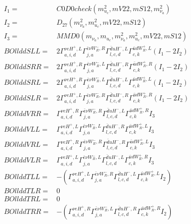 \documentclass[A4,landscape]{article}
\begin{document}
\begin{align} 
I_1 = & C0D0check(m^2_{u_{{c}}}, mV22, mS12, m^2_{\nu_{{a}}}) \\ 
I_2 = & D_{27}(m^2_{\nu_{{a}}}, m^2_{u_{{c}}}, mV22, mS12) \\ 
I_3 = & MMD0(m_{\nu_{{a}}}, m_{u_{{c}}}, m^2_{\nu_{{a}}}, m^2_{u_{{c}}}, mV22, mS12) \\ 
  BOllddSLL= & 2  \Gamma^{\nu e H^+,L}_{a, i, d} \Gamma^{\bar{e}\nu W_R^- ,R}_{j, a} \Gamma^{\bar{d}u H^- ,L}_{l, c, d} \Gamma^{\bar{u}d W_R^+,L}_{c, k} (I_1 - 2 I_2) \\ 
  BOllddSRR= & 2  \Gamma^{\nu e H^+,R}_{a, i, d} \Gamma^{\bar{e}\nu W_R^- ,L}_{j, a} \Gamma^{\bar{d}u H^- ,R}_{l, c, d} \Gamma^{\bar{u}d W_R^+,R}_{c, k} (I_1 - 2 I_2) \\ 
  BOllddSRL= & 2  \Gamma^{\nu e H^+,R}_{a, i, d} \Gamma^{\bar{e}\nu W_R^- ,L}_{j, a} \Gamma^{\bar{d}u H^- ,L}_{l, c, d} \Gamma^{\bar{u}d W_R^+,L}_{c, k} (I_1 - 2 I_2) \\ 
  BOllddSLR= & 2  \Gamma^{\nu e H^+,L}_{a, i, d} \Gamma^{\bar{e}\nu W_R^- ,R}_{j, a} \Gamma^{\bar{d}u H^- ,R}_{l, c, d} \Gamma^{\bar{u}d W_R^+,R}_{c, k} (I_1 - 2 I_2) \\ 
  BOllddVRR= &  \Gamma^{\nu e H^+,R}_{a, i, d} \Gamma^{\bar{e}\nu W_R^- ,R}_{j, a} \Gamma^{\bar{d}u H^- ,L}_{l, c, d} \Gamma^{\bar{u}d W_R^+,R}_{c, k} I_3 \\ 
  BOllddVLL= &  \Gamma^{\nu e H^+,L}_{a, i, d} \Gamma^{\bar{e}\nu W_R^- ,L}_{j, a} \Gamma^{\bar{d}u H^- ,R}_{l, c, d} \Gamma^{\bar{u}d W_R^+,L}_{c, k} I_3 \\ 
  BOllddVRL= &  \Gamma^{\nu e H^+,R}_{a, i, d} \Gamma^{\bar{e}\nu W_R^- ,R}_{j, a} \Gamma^{\bar{d}u H^- ,R}_{l, c, d} \Gamma^{\bar{u}d W_R^+,L}_{c, k} I_3 \\ 
  BOllddVLR= &  \Gamma^{\nu e H^+,L}_{a, i, d} \Gamma^{\bar{e}\nu W_R^- ,L}_{j, a} \Gamma^{\bar{d}u H^- ,L}_{l, c, d} \Gamma^{\bar{u}d W_R^+,R}_{c, k} I_3 \\ 
  BOllddTLL= & -( \Gamma^{\nu e H^+,L}_{a, i, d} \Gamma^{\bar{e}\nu W_R^- ,R}_{j, a} \Gamma^{\bar{d}u H^- ,L}_{l, c, d} \Gamma^{\bar{u}d W_R^+,L}_{c, k} I_2) \\ 
  BOllddTLR= & 0 \\ 
  BOllddTRL= & 0 \\ 
  BOllddTRR= & -( \Gamma^{\nu e H^+,R}_{a, i, d} \Gamma^{\bar{e}\nu W_R^- ,L}_{j, a} \Gamma^{\bar{d}u H^- ,R}_{l, c, d} \Gamma^{\bar{u}d W_R^+,R}_{c, k} I_2) \\ 
\end{align} 
\end{document}
